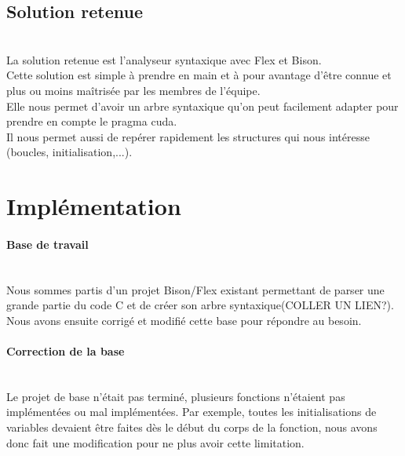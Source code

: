 \documentclass{article}
\begin{document}
	
	\subsection{Solution retenue}
	~~\\
	\indent
	La solution retenue est l'analyseur syntaxique avec Flex et Bison. \\Cette solution est simple à prendre en main et à pour avantage d'être connue et plus ou moins maîtrisée par les membres de l'équipe. \\Elle nous permet d'avoir un arbre syntaxique qu'on peut facilement adapter pour prendre en compte le pragma cuda. \\Il nous permet aussi de repérer rapidement les structures qui nous intéresse (boucles, initialisation,...).

	
	\newpage
	
	
	
	
	\section{Implémentation}
	
	\paragraph{Base de travail}
	~~\\
	\indent
	Nous sommes partis d'un projet Bison/Flex existant permettant de parser une grande partie du code C et de créer son arbre syntaxique(COLLER UN LIEN?). Nous avons ensuite corrigé et modifié cette base pour répondre au besoin.
	
	\paragraph{Correction de la base}
	~~\\
	\indent
	Le projet de base n'était pas terminé, plusieurs fonctions n'étaient pas implémentées ou mal implémentées. Par exemple, toutes les initialisations de variables devaient être faites dès le début du corps de la fonction, nous avons donc fait une modification pour ne plus avoir cette limitation.
	
\end{document}
